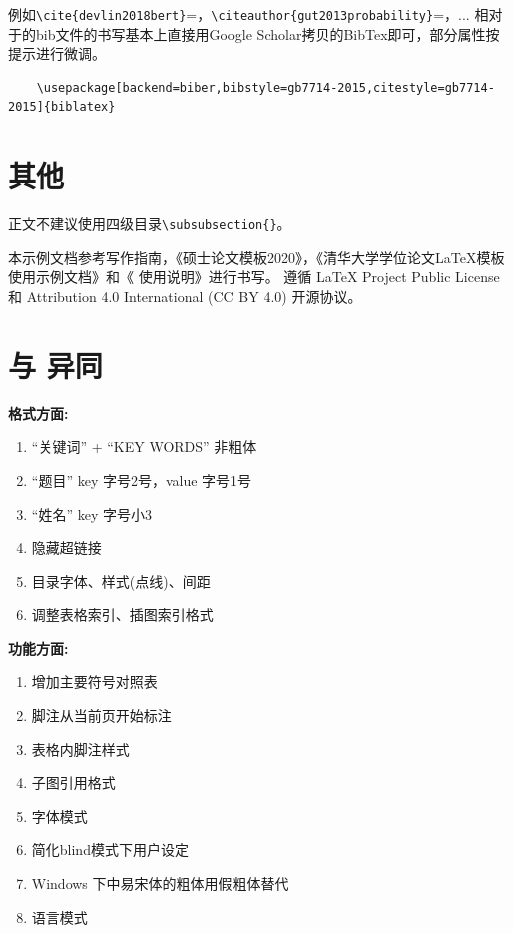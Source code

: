 例如\verb|\cite{devlin2018bert}|=\cite{devlin2018bert}，\verb|\citeauthor{gut2013probability}|=\citeauthor{gut2013probability}，...
相对于的bib文件的书写基本上直接用Google Scholar拷贝的BibTex即可，部分属性按提示进行微调。
\begin{Verbatim}
    \usepackage[backend=biber,bibstyle=gb7714-2015,citestyle=gb7714-2015]{biblatex}
\end{Verbatim}

\section{其他}
\label{sec:other}

正文不建议使用四级目录\verb|\subsubsection{}|。

本示例文档参考写作指南，《硕士论文模板2020》，《清华大学学位论文\LaTeX{}模板使用示例文档》和《\pkuthss{} 使用说明》进行书写。
遵循 \LaTeX{} Project Public License 和 Attribution 4.0 International (CC BY 4.0) 开源协议。

\section{与\pkuthss{} \iofubaseversion{}异同}

\textbf{格式方面:}

\begin{enumerate}
    \item ``关键词” + ``KEY WORDS” 非粗体 
    \item ``题目” key 字号2号，value 字号1号
    \item ``姓名” key 字号小3
    \item 隐藏超链接
    \item 目录字体、样式(点线)、间距
    \item 调整表格索引、插图索引格式
\end{enumerate}

\textbf{功能方面:}

\begin{enumerate}
    \item 增加主要符号对照表
    \item 脚注从当前页开始标注
    \item 表格内脚注样式
    \item 子图引用格式
    \item 字体模式
    \item 简化blind模式下用户设定
    \item Windows 下中易宋体的粗体用假粗体替代
    \item 语言模式
\end{enumerate}
